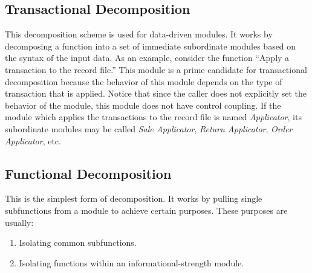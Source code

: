 \documentclass[format.tex]{subfiles}
\begin{document}
\subsection{Transactional Decomposition}
This decomposition scheme is used for data-driven modules. It works by
decomposing a function into a set of immediate subordinate modules based on
the syntax of the input data. As an example, consider the function ``Apply
a transaction to the record file.'' This module is a prime candidate for
transactional decomposition because the behavior of this module depends on the
type of transaction that is applied. Notice that since the caller does not
explicitly set the behavior of the module, this module does not have control
coupling. If the module which applies the transactions to the record file is
named {\it Applicator}, its subordinate modules may be called
{\it Sale Applicator}, {\it Return Applicator}, {\it Order Applicator}, etc.

\subsection{Functional Decomposition}
This is the simplest form of decomposition. It works by pulling single
subfunctions from a module to achieve certain purposes. These purposes are
usually:
\begin{enumerate}
\item Isolating common subfunctions.
\item Isolating functions within an informational-strength module.
\end{enumerate}
\end{document}
